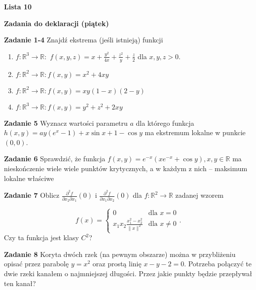 \documentclass[a4paper,11pt]{article}
\begin{document}
\begin{center}
  {\large\textbf{Lista 10}}
\end{center}

\hrulefill
\begin{center}
    \textbf{Zadania do deklaracji (piątek)}
\end{center}

\bigskip

\textbf{Zadanie 1-4} Znajdź ekstrema (jeśli istnieją) funkcji 

\begin{enumerate}
  \item $f: \mathbb{R}^3 \to \mathbb{R}:$ $f(x,y,z) = x+ \frac{y^2}{4x} +
    \frac{z^2}{y} + \frac{z}{2}$ dla $x,y,z > 0$.
  \item $f: \mathbb{R}^2 \to \mathbb{R}: f(x,y) = x^2 + 4xy$
  \item $f: \mathbb{R}^2 \to \mathbb{R}: f(x,y) = xy(1-x)(2-y)$
  \item $f: \mathbb{R}^3 \to \mathbb{R}: f(x,y) = y^2 + z^2 + 2xy$
\end{enumerate}

\bigskip

\hrulefill

\bigskip

\textbf{Zadanie 5} Wyznacz wartości parametru $a$ dla którego funkcja
$h(x,y) = ay(e^x - 1) + x\sin x + 1 - \cos y$ ma ekstremum lokalne w
punkcie $(0,0)$.

\bigskip

\textbf{Zadanie 6} Sprawdzić, że funkcja $f(x,y) = e^{-x} (x e^{-x} +
\cos y), x,y \in \mathbb{R}$ ma nieskończenie wiele wiele punktów
krytycznych, a w każdym z nich – maksimum lokalne właściwe

\bigskip

\textbf{Zadanie 7} Oblicz $\frac{\partial^2 f}{\partial x_2 \partial
x_1}(0)$ i $\frac{\partial^2 f}{\partial x_1 \partial x_2}(0)$ dla $f:
\mathbb{R}^2 \to \mathbb{R}$ zadanej wzorem 

\[
f(x) = 
\begin{cases}
  0 & \text{dla } x=0 \\
  x_1 x_2 \frac{x_1^2 - x_2^2}{\|x\|^2} & \text{dla } x \neq 0
\end{cases}
.\] 
Czy ta funkcja jest klasy $C^2$?

\bigskip

\textbf{Zadanie 8} Koryta dwóch rzek (na pewnym obszarze) można w
przybliżeniu opisać przez parabolę $y=x^2$ oraz prostą linię  $x-y-2=0$.
Potrzeba połączyć te dwie rzeki kanałem o najmniejszej długości. Przez
jakie punkty będzie przepływał ten kanał?
\end{document}
